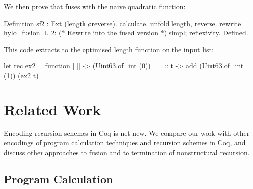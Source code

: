 \documentclass[a4paper,anonymous, UKenglish,cleveref, autoref, thm-restate]{lipics-v2021}
\begin{document}
\noindent
We then prove that  fuses with
the naive quadratic  function:
\begin{coqcode}
Definition sf2 : Ext (length \o reverse).
  calculate.  unfold length, reverse. rewrite hylo_fusion_l.
  2:{ (* Rewrite into the fused version *) }
  simpl; reflexivity.
Defined.
\end{coqcode}
This code extracts to the optimised length function on the input list:
\begin{ocamlcode}
let rec ex2 = function | [] -> (Uint63.of_int (0))
                       | _ :: t -> add (Uint63.of_int (1)) (ex2 t)
\end{ocamlcode}

\section{Related Work}
\label{sec:related-work}
%
Encoding recursion schemes in Coq is not new. We compare our work with other
encodings of program calculation techniques and recursion schemes in Coq, and
discuss other approaches to fusion and to termination of nonstructural
recursion.

\subsection{Program Calculation}\label{sec:calccoq}
\end{document}
